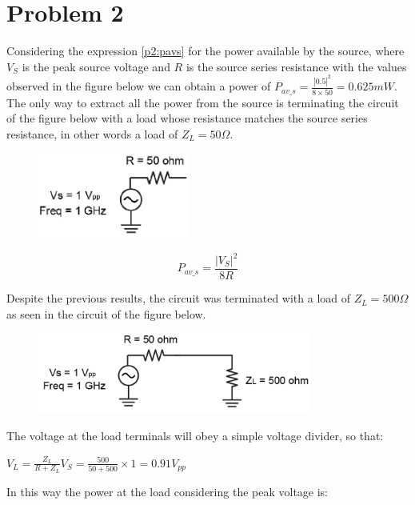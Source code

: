 \section{Problem 2}

Considering the expression \ref{p2:pavs} for the power available by the source, where $V_S$ is the peak source voltage and $R$ is the source series resistance with the values observed in the figure below we can obtain a power of $P_{av\_s} = \frac{|0.5|^2}{8 \times 50} = 0.625 mW$. The only way to extract all the power from the source is terminating the circuit of the figure below with a load whose resistance matches the source series resistance, in other words a load of $Z_L = 50 \Omega$.

\begin{figure}[H] 
\centering
\includegraphics[width=5cm]{images/ckt1p2.png}
\end{figure}

\begin{equation} \label{p2:pavs}
    P_{av\_s} = \frac{|V_S|^2}{8R}
\end{equation}

Despite the previous results, the circuit was terminated with a load of $Z_L = 500 \Omega$ as seen in the circuit of the figure below.

\begin{figure}[H] 
\centering
\includegraphics[width=9cm]{images/ckt2p2.png}
\end{figure}

The voltage at the load terminals will obey a simple voltage divider, so that: 

\begin{center}
    $V_L = \frac{Z_L}{R+Z_L} V_S = \frac{500}{50+500}\times 1 = 0.91 V_{pp}$
\end{center}

In this way the power at the load considering the peak voltage is:

